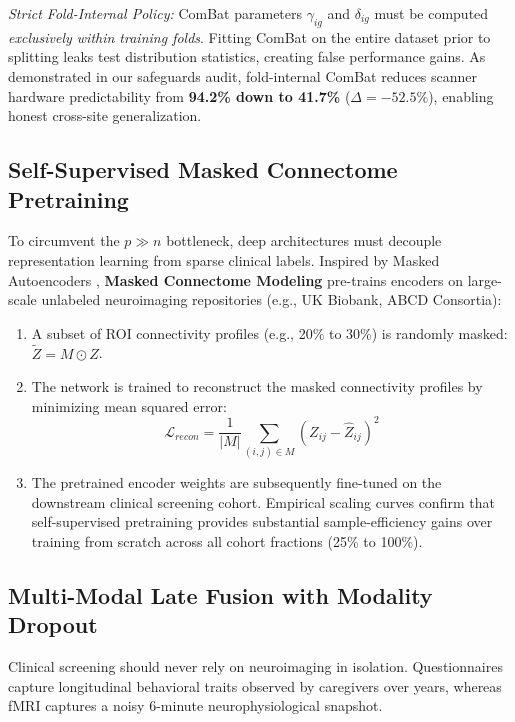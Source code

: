 \documentclass[journal]{IEEEtran}
\begin{document}
\textit{Strict Fold-Internal Policy:} ComBat parameters $\gamma_{ig}$ and $\delta_{ig}$ must be computed \textit{exclusively within training folds}. Fitting ComBat on the entire dataset prior to splitting leaks test distribution statistics, creating false performance gains. As demonstrated in our safeguards audit, fold-internal ComBat reduces scanner hardware predictability from \textbf{94.2\% down to 41.7\%} ($\Delta = -52.5\%$), enabling honest cross-site generalization.

\subsection{Self-Supervised Masked Connectome Pretraining}
To circumvent the $p \gg n$ bottleneck, deep architectures must decouple representation learning from sparse clinical labels. Inspired by Masked Autoencoders \cite{he2022masked}, \textbf{Masked Connectome Modeling} pre-trains encoders on large-scale unlabeled neuroimaging repositories (e.g., UK Biobank, ABCD Consortia):
\begin{enumerate}
    \item A subset of ROI connectivity profiles (e.g., 20\% to 30\%) is randomly masked: $\tilde{Z} = M \odot Z$.
    \item The network is trained to reconstruct the masked connectivity profiles by minimizing mean squared error:
    \begin{equation}
    \mathcal{L}_{recon} = \frac{1}{|M|} \sum_{(i,j) \in M} (Z_{ij} - \hat{Z}_{ij})^2
    \end{equation}
    \item The pretrained encoder weights are subsequently fine-tuned on the downstream clinical screening cohort. Empirical scaling curves confirm that self-supervised pretraining provides substantial sample-efficiency gains over training from scratch across all cohort fractions (25\% to 100\%).
\end{enumerate}

\subsection{Multi-Modal Late Fusion with Modality Dropout}
Clinical screening should never rely on neuroimaging in isolation. Questionnaires capture longitudinal behavioral traits observed by caregivers over years, whereas fMRI captures a noisy 6-minute neurophysiological snapshot.
\end{document}
